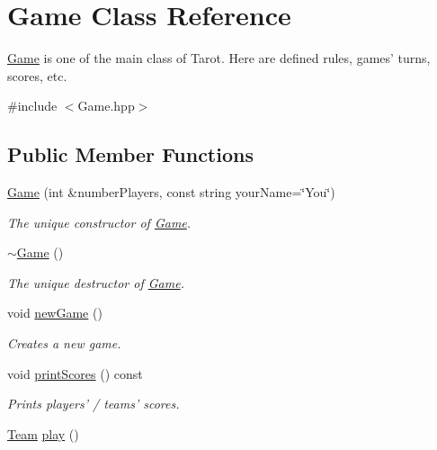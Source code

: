\hypertarget{classGame}{\section{\-Game \-Class \-Reference}
\label{classGame}
}


\hyperlink{classGame}{\-Game} is one of the main class of \-Tarot. \-Here are defined rules, games' turns, scores, etc.  




{\ttfamily \#include $<$\-Game.\-hpp$>$}

\subsection*{\-Public \-Member \-Functions}
\begin{DoxyCompactItemize}
\item 
\hyperlink{classGame_ad800214017e2813ed0dc77d95d5766aa}{\-Game} (int \&number\-Players, const string your\-Name=\char`\"{}\-You\char`\"{})
\begin{DoxyCompactList}\small\item\em \-The unique constructor of \hyperlink{classGame}{\-Game}. \end{DoxyCompactList}\item 
\hypertarget{classGame_ae3d112ca6e0e55150d2fdbc704474530}{\hyperlink{classGame_ae3d112ca6e0e55150d2fdbc704474530}{$\sim$\-Game} ()}\label{classGame_ae3d112ca6e0e55150d2fdbc704474530}

\begin{DoxyCompactList}\small\item\em \-The unique destructor of \hyperlink{classGame}{\-Game}. \end{DoxyCompactList}\item 
\hypertarget{classGame_a12f32ba70a35a0dcd1f527b4d4a0d2c4}{void \hyperlink{classGame_a12f32ba70a35a0dcd1f527b4d4a0d2c4}{new\-Game} ()}\label{classGame_a12f32ba70a35a0dcd1f527b4d4a0d2c4}

\begin{DoxyCompactList}\small\item\em \-Creates a new game. \end{DoxyCompactList}\item 
\hypertarget{classGame_acb39f55a7b0b1d0d35b06d305a508dd4}{void \hyperlink{classGame_acb39f55a7b0b1d0d35b06d305a508dd4}{print\-Scores} () const }\label{classGame_acb39f55a7b0b1d0d35b06d305a508dd4}

\begin{DoxyCompactList}\small\item\em \-Prints players' / teams' scores. \end{DoxyCompactList}\item 
\hypertarget{classGame_a6a76e181e24425eb361960d5b5d184bd}{\hyperlink{classTeam}{\-Team} \hyperlink{classGame_a6a76e181e24425eb361960d5b5d184bd}{play} ()}\label{classGame_a6a76e181e24425eb361960d5b5d184bd}


\end{DoxyCompactItemize}
